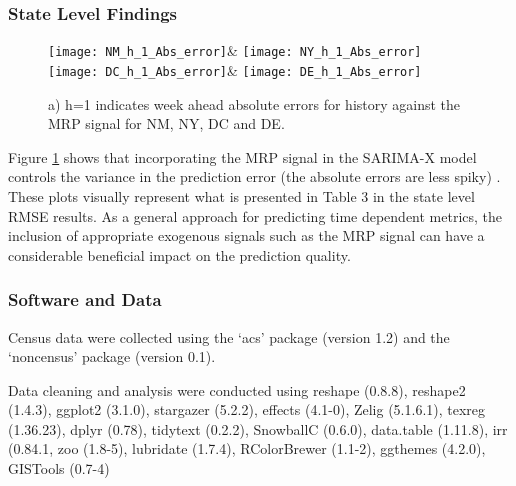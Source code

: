 \documentclass[12pt]{article}
\begin{document}
\clearpage

\subsubsection{State Level Findings}	

\begin{figure}[h!]	
 \centering	
 \texttt{[image: NM\_h\_1\_Abs\_error]}&	
  \texttt{[image: NY\_h\_1\_Abs\_error]}\\	
    \texttt{[image: DC\_h\_1\_Abs\_error]}&	
        \texttt{[image: DE\_h\_1\_Abs\_error]}	
 \caption{a) h=1 indicates week ahead absolute errors for history against the MRP signal for NM,  NY, DC and DE.}	
  \label{fig:State_Abs_Errs}	
\end{figure}	

Figure \ref{fig:State_Abs_Errs} shows that incorporating the MRP signal in the SARIMA-X model controls the variance in the prediction error (the absolute errors are less spiky) . These plots visually represent what is presented in Table 3 in the state level RMSE results. As a general approach for predicting time dependent metrics, the inclusion of appropriate exogenous signals such as the MRP signal can have a considerable beneficial impact on the prediction quality. 

\subsubsection{Software and Data}

Census data were collected using the ‘acs’ package \citep{acs} (version 1.2) and the ‘noncensus’ package \citep{noncensus} (version 0.1). 

Data cleaning and analysis were conducted using reshape \citep{reshape} (0.8.8), reshape2 \citep{reshape} (1.4.3), ggplot2 \citep{ggplot} (3.1.0), stargazer \citep{stargazer} (5.2.2), effects \citep{effects} (4.1-0), Zelig \citep{Zelig} (5.1.6.1), texreg \citep{texreg} (1.36.23), dplyr \citep{dplyr} (0.78), tidytext \citep{tidytext} (0.2.2), SnowballC \citep{SnowballC} (0.6.0), data.table \citep{data.table} (1.11.8), irr \citep{irr} (0.84.1, zoo \citep{zoo} (1.8-5), lubridate \citep{lubridate} (1.7.4), RColorBrewer \citep{RColorBrewer} (1.1-2), ggthemes \citep{ggthemes} (4.2.0), GISTools \citep{GISTools} (0.7-4)


\singlespace


\end{document}
